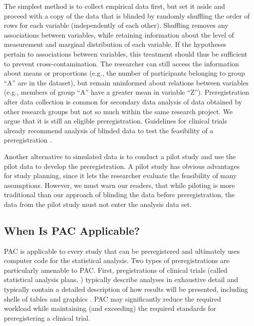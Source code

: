 \documentclass[psych,tutorial,submit,moreauthors,pdftex]{mdpi}
\begin{document}
The simplest method is to collect empirical data first, but set it aside
and proceed with a copy of the data that is blinded by randomly
shuffling the order of rows for each variable (independently of each
other). Shuffling removes any associations between variables, while
retaining information about the level of measurement and marginal
distribution of each variable. If the hypotheses pertain to associations
between variables, this treatment should thus be sufficient to prevent
cross-contamination. The researcher can still access the information
about means or proportions (e.g., the number of participants belonging
to group ``A'' are in the dataset), but remain uninformed about
relations between variables (e.g., members of group ``A'' have a greater
mean in variable ``Z''). Preregistration after data collection is common
for secondary data analysis of data obtained by other research groups
\citep{westonRecommendationsIncreasingTransparency2019} but not so much
within the same research project. We argue that it is still an eligible
preregistration. Guidelines for clinical trials already recommend
analysis of blinded data to test the feasibility of a preregistration
\citep{ICH1998}.

Another alternative to simulated data is to conduct a pilot study
\citep{thabaneTutorialPilotStudies2010} and use the pilot data to
develop the preregistration. A pilot study has obvious advantages for
study planning, since it lets the researcher evaluate the feasibility of
many assumptions. However, we must warn our readers, that while piloting
is more traditional than our approach of blinding the data before
preregistration, the data from the pilot study must not enter the
analysis data set.

\hypertarget{when-is-pac-applicable}{%
\subsection{When Is PAC Applicable?}\label{when-is-pac-applicable}}

PAC is applicable to every study that can be preregistered and
ultimately uses computer code for the statistical analysis. Two types of
preregistrations are particularly amenable to PAC. First, pregistrations
of clinical trials (called statistical analysis plans, \citet{ICH1998})
typically describe analyses in exhaustive detail and typically contain a
detailed description of how results will be presented, including shells
of tables and graphics \citep{yuanGuideStatisticalAnalysis2019}. PAC may
significantly reduce the required workload while maintaining (and
exceeding) the required standards for preregistering a clinical trial.
\end{document}
